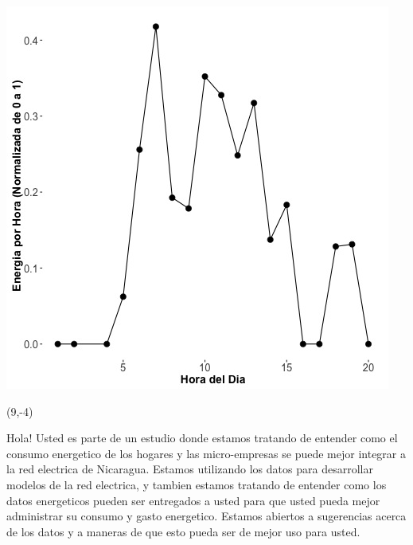 \documentclass{article}\usepackage[]{graphicx}\usepackage[]{color}
\newenvironment{knitrout}{}{} %
\begin{document}
\begin{knitrout}
\color{fgcolor}
\includegraphics[scale=0.75]{figure/A28_fplot_norm_median} 
\end{knitrout}

 \begin{textblock}{1}(9,-4)
\begin{minipage}{20em}
\begingroup

\endgroup
\end{minipage}
\end{textblock}

\vspace{70px}
\begin{knitrout}
Hola! Usted es parte de un estudio donde estamos tratando de entender como el consumo energetico de los hogares y las micro-empresas se puede mejor integrar a la red electrica de Nicaragua. Estamos utilizando los datos para desarrollar modelos de la red electrica, y tambien estamos tratando de entender como los datos energeticos pueden ser entregados a usted para que usted pueda mejor administrar su consumo y gasto energetico.  Estamos abiertos a sugerencias acerca de los datos y a maneras de que esto pueda ser de mejor uso para usted.
\end{knitrout}
\end{document}
